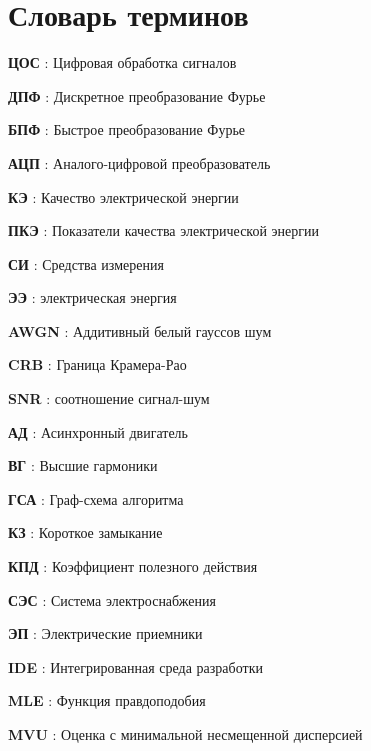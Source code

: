 \chapter*{Словарь терминов}             %

\textbf{ЦОС} : Цифровая обработка сигналов

\textbf{ДПФ} : Дискретное преобразование Фурье

\textbf{БПФ} : Быстрое преобразование Фурье

\textbf{АЦП} : Аналого-цифровой преобразователь

\textbf{КЭ} : Качество электрической энергии

\textbf{ПКЭ} : Показатели качества электрической энергии

\textbf{СИ} : Средства измерения

\textbf{ЭЭ} : электрическая энергия

\textbf{AWGN} : Аддитивный белый гауссов шум

\textbf{CRB} : Граница Крамера-Рао

\textbf{SNR} : соотношение сигнал-шум

\textbf{АД} : Асинхронный двигатель

\textbf{ВГ} : Высшие гармоники

\textbf{ГСА} : Граф-схема алгоритма 

\textbf{КЗ} : Короткое замыкание

\textbf{КПД} : Коэффициент полезного действия

\textbf{СЭС} : Система электроснабжения

\textbf{ЭП} : Электрические приемники

\textbf{IDE} : Интегрированная среда разработки

\textbf{MLE} : Функция правдоподобия 

\textbf{MVU} : Оценка с минимальной несмещенной дисперсией
